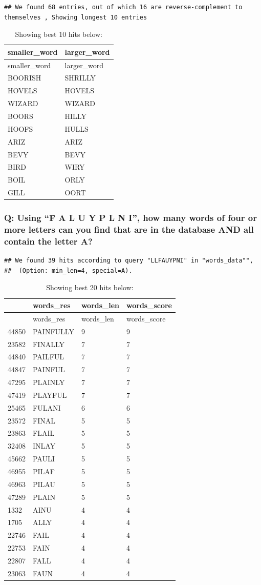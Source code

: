 \documentclass[a4paperpaper,]{article}
\begin{document}
\begin{verbatim}
## We found 68 entries, out of which 16 are reverse-complement to themselves , Showing longest 10 entries
\end{verbatim}

\begin{longtable}[]{@{}ll@{}}
\caption{Showing best 10 hits below:}\tabularnewline
\toprule
smaller\_word & larger\_word\tabularnewline
\midrule
\endfirsthead
\toprule
smaller\_word & larger\_word\tabularnewline
\midrule
\endhead
BOORISH & SHRILLY\tabularnewline
HOVELS & HOVELS\tabularnewline
WIZARD & WIZARD\tabularnewline
BOORS & HILLY\tabularnewline
HOOFS & HULLS\tabularnewline
ARIZ & ARIZ\tabularnewline
BEVY & BEVY\tabularnewline
BIRD & WIRY\tabularnewline
BOIL & ORLY\tabularnewline
GILL & OORT\tabularnewline
\bottomrule
\end{longtable}

\subsubsection{\texorpdfstring{Q: Using ``F A L U Y P L N I'', how many
words of four or more letters can you find that are in the database AND
all contain the letter
A?}{Q: Using F A L U Y P L N I, how many words of four or more letters can you find that are in the database AND all contain the letter A?}}\label{q-using-f-a-l-u-y-p-l-n-i-how-many-words-of-four-or-more-letters-can-you-find-that-are-in-the-database-and-all-contain-the-letter-a}

\begin{verbatim}
## We found 39 hits according to query "LLFAUYPNI" in "words_data"", 
##  (Option: min_len=4, special=A).
\end{verbatim}

\begin{longtable}[]{@{}llll@{}}
\caption{Showing best 20 hits below:}\tabularnewline
\toprule
& words\_res & words\_len & words\_score\tabularnewline
\midrule
\endfirsthead
\toprule
& words\_res & words\_len & words\_score\tabularnewline
\midrule
\endhead
44850 & PAINFULLY & 9 & 9\tabularnewline
23582 & FINALLY & 7 & 7\tabularnewline
44840 & PAILFUL & 7 & 7\tabularnewline
44847 & PAINFUL & 7 & 7\tabularnewline
47295 & PLAINLY & 7 & 7\tabularnewline
47419 & PLAYFUL & 7 & 7\tabularnewline
25465 & FULANI & 6 & 6\tabularnewline
23572 & FINAL & 5 & 5\tabularnewline
23863 & FLAIL & 5 & 5\tabularnewline
32408 & INLAY & 5 & 5\tabularnewline
45662 & PAULI & 5 & 5\tabularnewline
46955 & PILAF & 5 & 5\tabularnewline
46963 & PILAU & 5 & 5\tabularnewline
47289 & PLAIN & 5 & 5\tabularnewline
1332 & AINU & 4 & 4\tabularnewline
1705 & ALLY & 4 & 4\tabularnewline
22746 & FAIL & 4 & 4\tabularnewline
22753 & FAIN & 4 & 4\tabularnewline
22807 & FALL & 4 & 4\tabularnewline
23063 & FAUN & 4 & 4\tabularnewline
\bottomrule
\end{longtable}
\end{document}
